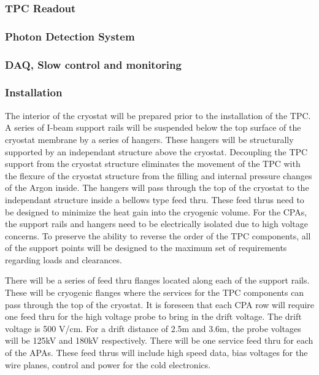 


\subsubsection{TPC Readout}



\subsubsection{Photon Detection System}


\subsubsection{DAQ, Slow control and monitoring}


\subsubsection{Installation}

The interior of the cryostat will be prepared prior to the installation of the TPC.  A series of I-beam support rails will be suspended below the top surface of the cryostat membrane by a series of hangers.  These hangers will be structurally supported by an independant structure above the cryostat.  Decoupling the TPC support from the cryostat structure eliminates the movement of the TPC with the flexure of the cryostat structure from the filling and internal pressure changes of the Argon inside.  The hangers will pass through the top of the cryostat to the independant structure inside a bellows type feed thru.  These feed thrus need to be designed to minimize the heat gain into the cryogenic volume.  For the CPAs, the support rails and hangers need to be electrically isolated due to high voltage concerns.  To preserve the ability to reverse the order of the TPC components, all of the support points will be designed to the maximum set of requirements regarding loads and clearances.  

There will be a series of feed thru flanges located along each of the support rails.  These will be cryogenic flanges where the services for the TPC components can pass through the top of the cryostat.  It is foreseen that each CPA row will require one feed thru for the high voltage probe to bring in the drift voltage.  The drift voltage is 500 V/cm.  For a drift distance of 2.5m and 3.6m, the probe voltages will be 125kV and 180kV respectively.  There will be one service feed thru for each of the APAs.  These feed thrus will include high speed data, bias voltages for the wire planes, control and power for the cold electronics.  

